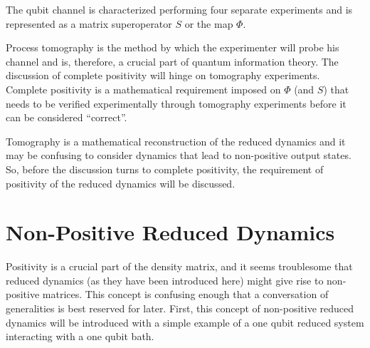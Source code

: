 The qubit channel is characterized performing four separate experiments and is represented as a matrix superoperator $S$ or the map $\Phi$.     

Process tomography is the method by which the experimenter will probe his channel and is, therefore, a crucial part of quantum information theory.  The discussion of complete positivity will hinge on tomography experiments.  Complete positivity is a mathematical requirement imposed on $\Phi$ (and $S$) that needs to be verified experimentally through tomography experiments before it can be considered ``correct''.  

Tomography is a mathematical reconstruction of the reduced dynamics and it may be confusing to consider dynamics that lead to non-positive output states. So, before the discussion turns to complete positivity, the requirement of positivity of the reduced dynamics will be discussed. 

\section{Non-Positive Reduced Dynamics}
\label{sec:posdomain}

Positivity is a crucial part of the density matrix, and it seems troublesome that reduced dynamics (as they have been introduced here) might give rise to non-positive matrices.  This concept is confusing enough that a conversation of generalities is best reserved for later.  First, this concept of non-positive reduced dynamics will be introduced with a simple example of a one qubit reduced system interacting with a one qubit bath.

